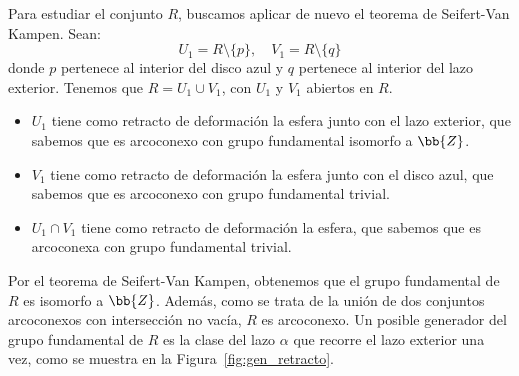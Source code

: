\documentclass[12pt]{article}
\begin{document}
\begin{ejercicio}[2 puntos]
\begin{itemize}
            Para estudiar el conjunto $R$, buscamos aplicar de nuevo el teorema de Seifert-Van Kampen. Sean:
            \begin{equation*}
                U_1 = R\setminus \{p\}, \quad V_1 = R\setminus \{q\}
            \end{equation*}
            donde $p$ pertenece al interior del disco azul y $q$ pertenece al interior del lazo exterior. Tenemos que $R=U_1\cup V_1$, con $U_1$ y $V_1$ abiertos en $R$. \begin{itemize}
                \item $U_1$ tiene como retracto de deformación la esfera junto con el lazo exterior, que sabemos que es arcoconexo con grupo fundamental isomorfo a $\bb{Z}$.
                \item $V_1$ tiene como retracto de deformación la esfera junto con el disco azul, que sabemos que es arcoconexo con grupo fundamental trivial.
                \item $U_1\cap V_1$ tiene como retracto de deformación la esfera, que sabemos que es arcoconexa con grupo fundamental trivial.
            \end{itemize}

            Por el teorema de Seifert-Van Kampen, obtenemos que el grupo fundamental de $R$ es isomorfo a $\bb{Z}$. Además, como se trata de la unión de dos conjuntos arcoconexos con intersección no vacía, $R$ es arcoconexo. Un posible generador del grupo fundamental de $R$ es la clase del lazo $\alpha$ que recorre el lazo exterior una vez, como se muestra en la Figura~\ref{fig:gen_retracto}.
            \begin{figure}[h]
                \centering
\end{figure}
\end{itemize}
\end{ejercicio}
\end{document}
